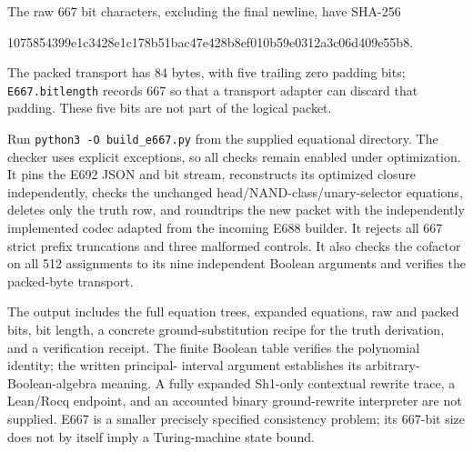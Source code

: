 The raw 667 bit characters, excluding the final newline, have SHA-256
\begin{center}\small\ttfamily
1075854399e1c3428e1c178b51bac47e428b8ef010b59e0312a3c06d409e55b8.
\end{center}
The packed transport has 84 bytes, with five trailing zero padding bits;
\texttt{E667.bitlength} records 667 so that a transport adapter can
discard that padding. These five bits are not part of the logical
packet.

Run \texttt{python3 -O build\_e667.py} from the supplied equational
directory. The checker uses explicit exceptions, so all checks remain
enabled under optimization. It pins the E692 JSON and bit stream,
reconstructs its optimized closure independently, checks the unchanged
head/NAND-class/unary-selector equations, deletes only the truth row,
and roundtrips the new packet with the independently implemented codec
adapted from the incoming E688 builder. It rejects all 667 strict
prefix truncations and three malformed controls. It also checks the
cofactor on all 512 assignments to its nine independent Boolean
arguments and verifies the packed-byte transport.

The output includes the full equation trees, expanded equations,
raw and packed bits, bit length, a concrete ground-substitution recipe
for the truth derivation, and a verification receipt. The finite
Boolean table verifies the polynomial identity; the written principal-
interval argument establishes its arbitrary-Boolean-algebra meaning.
A fully expanded Sh1-only contextual rewrite trace, a Lean/Rocq
endpoint, and an accounted binary ground-rewrite interpreter are not
supplied. E667 is a smaller precisely specified consistency problem;
its 667-bit size does not by itself imply a Turing-machine state bound.
